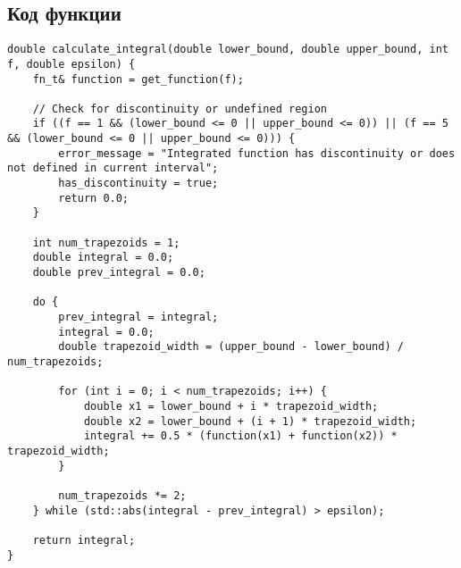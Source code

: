 \subsection{Код функции}
\begin{lstlisting}
double calculate_integral(double lower_bound, double upper_bound, int f, double epsilon) {
    fn_t& function = get_function(f);

    // Check for discontinuity or undefined region
    if ((f == 1 && (lower_bound <= 0 || upper_bound <= 0)) || (f == 5 && (lower_bound <= 0 || upper_bound <= 0))) {
        error_message = "Integrated function has discontinuity or does not defined in current interval";
        has_discontinuity = true;
        return 0.0;
    }

    int num_trapezoids = 1;
    double integral = 0.0;
    double prev_integral = 0.0;

    do {
        prev_integral = integral;
        integral = 0.0;
        double trapezoid_width = (upper_bound - lower_bound) / num_trapezoids;

        for (int i = 0; i < num_trapezoids; i++) {
            double x1 = lower_bound + i * trapezoid_width;
            double x2 = lower_bound + (i + 1) * trapezoid_width;
            integral += 0.5 * (function(x1) + function(x2)) * trapezoid_width;
        }

        num_trapezoids *= 2;
    } while (std::abs(integral - prev_integral) > epsilon);

    return integral;
}
\end{lstlisting}
